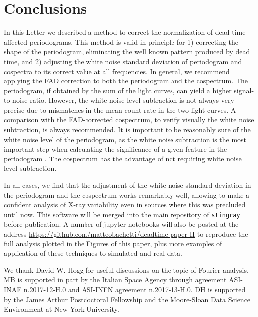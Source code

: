 \documentclass[twocolumn]{aastex61}
\begin{document}
\section{Conclusions}
In this Letter we described a method to correct the normalization of dead time-affected periodograms.
This method is valid in principle for 
1) correcting the shape of the periodogram, eliminating the well known pattern produced by dead time, and 
2) adjusting the white noise standard deviation of periodogram and cospectra to its correct value at all frequencies.
In general, we recommend applying the FAD correction to both the periodogram and the cospectrum. 
The periodogram, if obtained by the sum of the light curves, can yield a higher signal-to-noise ratio.
However, the white noise level subtraction is not always very precise due to mismatches in the mean count rate in the two light curves. 
A comparison with the FAD-corrected cospectrum, to verify visually the white noise subtraction, is always recommended.
It is important to be reasonably sure of the white noise level of the periodogram, as the white noise subtraction is the most important step when calculating the significance of a given feature in the periodogram \citep[e.g.][]{Barret+12,Huppenkothen+17}.
The cospectrum has the advantage of not requiring white noise level subtraction.

In all cases, we find that the adjustment of the white noise standard deviation in the periodogram and the cospectrum works remarkably well, allowing to make a confident analysis of X-ray variability even in sources where this was precluded until now.
This software will be merged into the main repository of \texttt{stingray} before publication.
A number of jupyter notebooks will also be posted at the address \href{https://github.com/matteobachetti/deadtime-paper-II}{https://github.com/matteobachetti/deadtime-paper-II} to reproduce the full analysis plotted in the Figures of this paper, plus more examples of application of these techniques to simulated and real data.

\acknowledgments
We thank David W. Hogg for useful discussions on the topic of Fourier analysis.
MB is supported in part by the Italian Space Agency through agreement ASI-INAF n.2017-12-H.0 and ASI-INFN agreement n.2017-13-H.0.
DH is supported by the James Arthur Postdoctoral Fellowship and the Moore-Sloan Data Science Environment at New York University.
\end{document}
